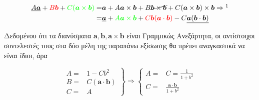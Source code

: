 \documentclass[a4paper]{article}
\begin{document}
                            \begin{align*}
                                \underline{A\bm{a}} + \textcolor{red}{B\bm{b}} + \textcolor{green}{C (\bm{a}\times\bm{b})} =& \bm{a} + A\bm{a}\times\bm{b} + B\cancel{\bm{b}\times\bm{b}} + C(\bm{a}\times\bm{b})\times\bm{b} \Rightarrow\footnotemark\\ 
                                =&\underline{\bm{a}} + \textcolor{green}{A\bm{a}\times\bm{b}} + \textcolor{red}{C\bm{b}(\bm{a}\cdot\bm{b})} - C \underline{\bm{a}(\bm{b}\cdot\bm{b})}
                            \end{align*}

                        Δεδομένου ότι τα διανύσματα $\bm{a},\bm{b},\bm{a}\times\bm{b}$ είναι Γραμμικώς Ανεξάρτητα, οι αντίστοιχοι συντελεστές τους στα δύο μέλη της παραπάνω εξίσωσης θα πρέπει αναγκαστικά να είναι ίδιοι, άρα 


                            
                            \begin{equation*}
                                  \left.\begin{aligned}
                                  A =& 1 - Cb^2\\
                                  B =& C (\bm{a}\cdot\bm{b})\\ 
                                  C =& A
                                \end{aligned}\right\} \Rightarrow \left\{ \begin{aligned}
                                    A =& C = \frac{1}{1+b^2}\\
                                    C =& \frac{\bm{a}\cdot\bm{b}}{1+b^2}
                                \end{aligned}\right.
                            \end{equation*}
\end{document}

